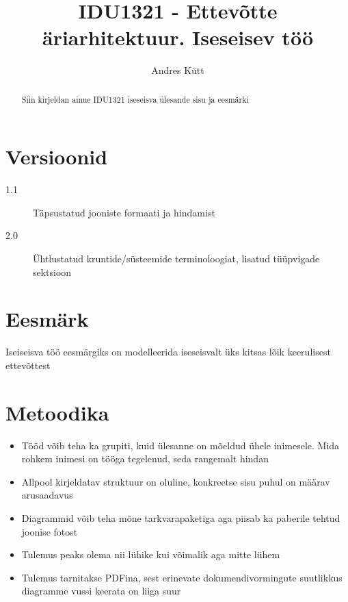 \documentclass[nobib]{tufte-handout}
\title{IDU1321 - Ettevõtte äriarhitektuur. Iseseisev töö}
\author[Andres Kütt]{Andres Kütt}
\begin{document}
\maketitle
\begin{abstract}
\noindent
Siin kirjeldan ainue IDU1321 iseseisva ülesande sisu ja eesmärki
\end{abstract}

\section{Versioonid}
\begin{description}
	\item[1.1] Täpsustatud jooniste formaati ja hindamist
	\item[2.0] Ühtlustatud kruntide/süsteemide terminoloogiat, lisatud tüüpvigade sektsioon
\end{description}

\section{Eesmärk}
Iseiseisva töö eesmärgiks on modelleerida iseseisvalt üks kitsas lõik keerulisest ettevõttest

\section{Metoodika}
\begin{itemize}
	\item Tööd võib teha ka grupiti, kuid ülesanne on mõeldud ühele inimesele. Mida rohkem inimesi on tööga tegelenud, seda rangemalt hindan
	\item Allpool kirjeldatav struktuur on oluline, konkreetse sisu puhul on määrav arusaadavus
	\item Diagrammid võib teha mõne tarkvarapaketiga aga piisab ka paberile tehtud joonise fotost
	\item Tulemus peaks olema nii lühike kui võimalik aga mitte lühem
	\item Tulemus tarnitakse PDFina, sest erinevate dokumendivormingute suutlikkus diagramme vussi keerata on liiga suur
\end{itemize}
\end{document}

